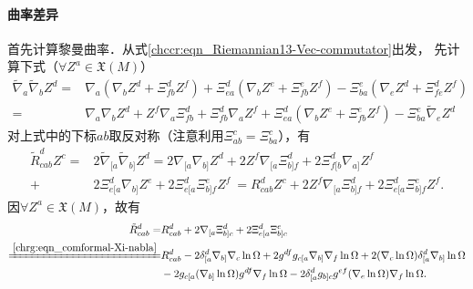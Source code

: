 \paragraph{曲率差异}
首先计算黎曼曲率．从式\eqref{chccr:eqn_Riemannian13-Vec-commutator}出发，
先计算下式（$\forall Z^a\in \mathfrak{X}(M)$）
\begin{align*}
    \tilde{\nabla}_a \tilde{\nabla}_b Z^d %
    =&{\nabla}_a (\nabla_b Z^d + \Xi_{fb}^d Z^f ) + \Xi_{ea}^d (\nabla_b Z^e + \Xi_{fb}^e Z^f )
    - \Xi_{ba}^e (\nabla_e Z^d + \Xi_{fe}^d Z^f ) \\
    =&{\nabla}_a \nabla_b Z^d + Z^f {\nabla}_a \Xi_{fb}^d   +\Xi_{fb}^d {\nabla}_a  Z^f +
       \Xi_{ea}^d (\nabla_b Z^e + \Xi_{fb}^e Z^f ) - \Xi_{ba}^e \tilde{\nabla}_e Z^d
\end{align*}
对上式中的下标$ab$取反对称（注意利用$\Xi_{ab}^c=\Xi_{ba}^c$），有
\begin{align*}
    \tilde{R}_{cab}^d Z^c =& 2 \tilde{\nabla}_{[a} \tilde{\nabla}_{b]} Z^d
    =2 {\nabla}_{[a} \nabla_{b]} Z^d + 2Z^f {\nabla}_{[a} \Xi_{b]f}^d  
    +2\Xi_{f[b}^d {\nabla}_{a]} Z^f \\
    +&2\Xi_{e[a}^d \nabla_{b]} Z^e + 2\Xi_{e[a}^d\Xi_{b]f}^e Z^f  
    \ =R_{cab}^d Z^c + 2Z^f {\nabla}_{[a} \Xi_{b]f}^d  + 2\Xi_{e[a}^d\Xi_{b]f}^e Z^f .
\end{align*} %
因$\forall Z^a\in \mathfrak{X}(M)$，故有
\begin{subequations}\label{chrg:eqn_comformal-Riemann}
\begin{align}
    \tilde{R}_{cab}^d=& R_{cab}^d + 2 {\nabla}_{[a} \Xi_{b]c}^d  + 2\Xi_{e[a}^d\Xi_{b]c}^e
    \label{chrg:eqn_comformal-Riemann-a}\\
    \xlongequal{\ref{chrg:eqn_comformal-Xi-nabla}}& R_{cab}^d -2\delta_{[a}^d{\nabla}_{b]}  \nabla_c \ln \Omega
    + 2{g}^{df} {g}_{c[a} {\nabla}_{b]} \nabla_f \ln\Omega
    + 2(\nabla_c \ln\Omega) \delta_{[a}^d\nabla_{b]} \ln\Omega  \notag \\
    &- 2 {g}_{c[a} (\nabla_{b]} \ln \Omega)  {g}^{df}\nabla_f \ln\Omega
    - 2\delta_{[a}^d {g}_{b]c} {g}^{ef}(\nabla_e \ln\Omega)\nabla_f \ln\Omega .
    \label{chrg:eqn_comformal-Riemann-c}
\end{align}
\end{subequations}
